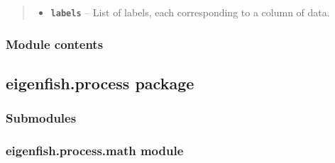 \documentclass[letterpaper,10pt,english]{sphinxmanual}
\begin{document}
\begin{fulllineitems}
\begin{fulllineitems}
\begin{quote}
\begin{description}
\begin{itemize}
\item {} 
\textbf{\texttt{labels}} -- List of labels, each corresponding to a column of data.

\end{itemize}

\end{description}\end{quote}

\end{fulllineitems}


\end{fulllineitems}



\subsubsection{Module contents}
\label{eigenfish.classify:module-eigenfish.classify}\label{eigenfish.classify:module-contents}

\subsection{eigenfish.process package}
\label{eigenfish.process:eigenfish-process-package}\label{eigenfish.process::doc}

\subsubsection{Submodules}
\label{eigenfish.process:submodules}

\subsubsection{eigenfish.process.math module}
\label{eigenfish.process:eigenfish-process-math-module}\label{eigenfish.process:module-eigenfish.process.math}
\end{document}
